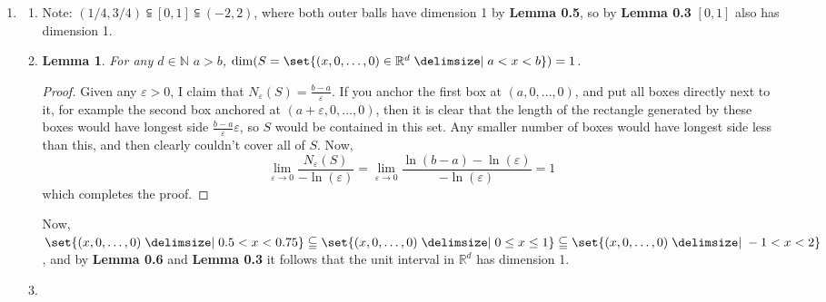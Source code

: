 \documentclass[12pt]{article}
\def\mbb#1{\mathbb{#1}}
\def\bN{\mbb{N}}
\newtheorem{lemma}[theorem]{Lemma}
\theoremstyle{definition}
\theoremstyle{remark}
\newcommand{\R}{\mathbb{R}}
\newcommand{\ve}{\varepsilon}
\begin{document}
\begin{enumerate}[leftmargin=\labelsep]
		\item 
			\begin{enumerate}
				\item Note: $(1/4, 3/4) \subseteqq [0, 1] \subseteqq (-2, 2)$, where both outer balls have dimension 1 by \textbf{Lemma 0.5}, so by \textbf{Lemma 0.3} $[0, 1]$ also has dimension 1.
				\item 
				\begin{lemma}
					For any $d \in \bN$ $a > b$, $\dim(S = \set{(x, 0, \ldots, 0) \in \R^d \given a < x < b}) = 1$. 
				\end{lemma}
				\begin{proof}
					Given any $\ve > 0$, I claim that $N_{\ve}(S) = \frac{b-a}{\ve}$. 
					If you anchor the first box at $(a, 0, \ldots, 0)$, and put all boxes directly next to it, for example the second box anchored at $(a+\ve, 0, \ldots, 0)$, then it is clear that the length of the rectangle generated by these boxes would have longest side $\frac{b-a}{\ve} \ve$, so $S$ would be contained in this set. Any smaller number of boxes would have longest side less than this, and then clearly couldn't cover all of $S$. Now, 
					\[ \lim_{\ve \to 0} \frac{N_\ve(S)}{-\ln(\ve)} = \lim_{\ve \to 0} \frac{\ln(b-a) - \ln(\ve)}{-\ln(\ve)} = 1 \]
					which completes the proof.
				\end{proof}
				Now, $\set{(x, 0, \ldots, 0) \given 0.5 < x < 0.75} \subseteqq \set{(x, 0, \ldots, 0) \given 0 \leq x \leq 1} \subseteqq \set{(x, 0, \ldots, 0) \given -1 < x < 2}$, and by \textbf{Lemma 0.6} and \textbf{Lemma 0.3} it follows that the unit interval in $\R^d$ has dimension 1.
				\item 

\end{enumerate}
\end{enumerate}
\end{document}
